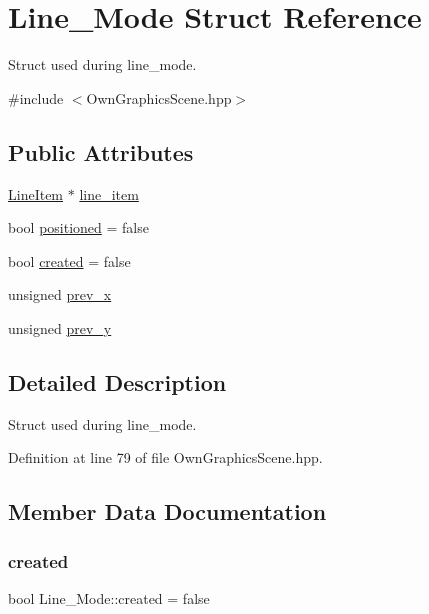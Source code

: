\hypertarget{structLine__Mode}{}\section{Line\+\_\+\+Mode Struct Reference}
\label{structLine__Mode}


Struct used during line\+\_\+mode.  




{\ttfamily \#include $<$Own\+Graphics\+Scene.\+hpp$>$}

\subsection*{Public Attributes}
\begin{DoxyCompactItemize}
\item 
\mbox{\hyperlink{classLineItem}{Line\+Item}} $\ast$ \mbox{\hyperlink{structLine__Mode_a4e11b31f28505579f3dfcde54b27ecac}{line\+\_\+item}}
\item 
bool \mbox{\hyperlink{structLine__Mode_aefbb8555f406d47d742491003a6afde1}{positioned}} = false
\item 
bool \mbox{\hyperlink{structLine__Mode_ae48257668288a2a284bef66727fa68e5}{created}} = false
\item 
unsigned \mbox{\hyperlink{structLine__Mode_a8bbcbaff29a7810e066e99174e562371}{prev\+\_\+x}}
\item 
unsigned \mbox{\hyperlink{structLine__Mode_a8d5fb940f686955ead3f368a8d3b9016}{prev\+\_\+y}}
\end{DoxyCompactItemize}


\subsection{Detailed Description}
Struct used during line\+\_\+mode. 

Definition at line 79 of file Own\+Graphics\+Scene.\+hpp.



\subsection{Member Data Documentation}
\mbox{\label{structLine__Mode_ae48257668288a2a284bef66727fa68e5}} 
\subsubsection{\texorpdfstring{created}{created}}
{\footnotesize\ttfamily bool Line\+\_\+\+Mode\+::created = false}

